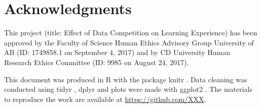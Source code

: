 \documentclass[12pt]{article}
\begin{document}
\section{Acknowledgments}\label{acknowledgments}

This project (title: Effect of Data Competition on Learning Experience)
has been approved by the Faculty of Science Human Ethics Advisory Group
University of AB (ID: 1749858.1 on September 4, 2017) and by CD
University Human Research Ethics Committee (ID: 9985 on August 24,
2017).

This document was produced in R \citep{R} with the package knitr
\citep{knitr}. Data cleaning was conducted using tidyr \citep{tidyr},
dplyr \citep{dplyr} and plots were made with ggplot2 \citep{ggplot2}.
The materials to reproduce the work are available at
\url{https://github.com/XXX}.



\end{document}
